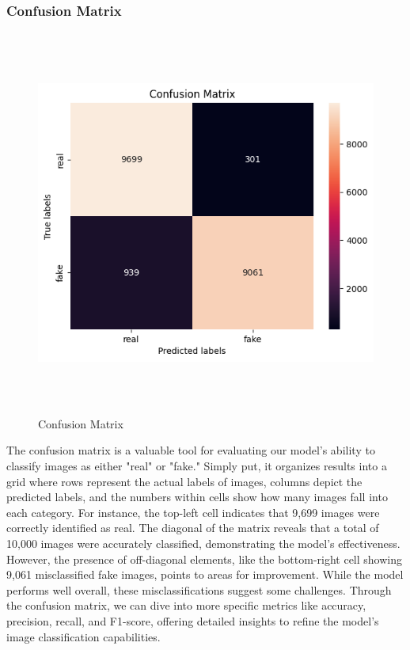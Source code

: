 \subsubsection{Confusion Matrix}
\begin{figure}[ht]
    \centering
    \includegraphics[width=5in, height =5in ]{img/confusionMatrixImage.png}
    \caption{{Confusion Matrix }}
\end{figure}
\noindent The confusion matrix is a valuable tool for evaluating our model's ability to classify images as either "real" or "fake." Simply put, it organizes results into a grid where rows represent the actual labels of images, columns depict the predicted labels, and the numbers within cells show how many images fall into each category. For instance, the top-left cell indicates that 9,699 images were correctly identified as real. The diagonal of the matrix reveals that a total of 10,000 images were accurately classified, demonstrating the model's effectiveness. However, the presence of off-diagonal elements, like the bottom-right cell showing 9,061 misclassified fake images, points to areas for improvement. While the model performs well overall, these misclassifications suggest some challenges. Through the confusion matrix, we can dive into more specific metrics like accuracy, precision, recall, and F1-score, offering detailed insights to refine the model's image classification capabilities.
\newpage
